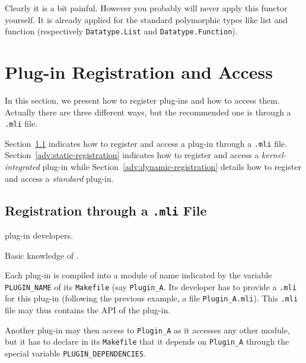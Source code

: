 Clearly it is a bit painful. However you probably will never apply this
functor yourself. It is already applied for the standard \ocaml polymorphic
types like list and function (respectively
\texttt{Datatype.List} and
\texttt{Datatype.Function}).


\section{Plug-in Registration and Access}\label{adv:plugin-registration}

In this section, we present how to register plug-ins and how to access them.
Actually there are three different ways, but the recommended one is through a
\texttt{.mli} file.

Section~\ref{adv:standard-registration} indicates how to register and access a
plug-in through a \texttt{.mli} file. Section~\ref{adv:static-registration}
indicates how to register and access a \emph{kernel-integrated} plug-in while
Section~\ref{adv:dynamic-registration} details how to register and access a
\emph{standard} plug-in.

\subsection{Registration through a \texttt{.mli} File}
\label{adv:standard-registration}

\begin{target}plug-in developers.\end{target}
\begin{prereq}
  Basic knowledge of \make.
\end{prereq}

Each plug-in is compiled into a module of name indicated by the variable
\texttt{PLUGIN\_NAME} of its \texttt{Makefile} (say
\texttt{Plugin\_A}. Its developer has to provide a \texttt{.mli} for this
plug-in (following the previous example, a file \texttt{Plugin\_A.mli}). This
\texttt{.mli} file may thus contains the API of the plug-in.

Another plug-in may then access to \texttt{Plugin\_A} as it accesses any
other \caml module, but it has to declare in its \texttt{Makefile} that it
depends on \texttt{Plugin\_A} through the special variable
\texttt{PLUGIN\_DEPENDENCIES}.

